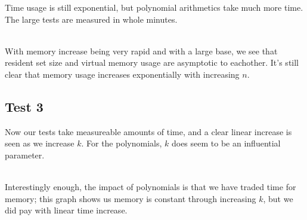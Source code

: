 \documentclass[a4paper, titlepage]{article}
\begin{document}
Time usage is still exponential, but polynomial arithmetics take much more time. The large tests are measured in whole minutes.
\\\\

With memory increase being very rapid and with a large base, we see that resident set size and virtual memory usage are asymptotic to eachother. It's still clear that memory usage increases exponentially with increasing $n$.

\subsection*{Test 3}


Now our tests take measureable amounts of time, and a clear linear increase is seen as we increase $k$. For the polynomials, $k$ does seem to be an influential parameter.
\\\\

Interestingly enough, the impact of polynomials is that we have traded time for memory; this graph shows us memory is constant through increasing $k$, but we did pay with linear time increase.
\end{document}

